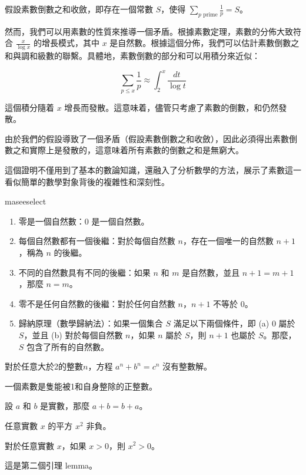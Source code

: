 \documentclass[
    writingLanguage=chinese, %
    addPageTitle=on,  %
    addDeclaration=on, %
    addMUSTlog=off, %
    addFigTOC=on, %
    addTabTOC=on, %
    refIndent=off, %
    printMod=off, %
]{must}
\begin{document}
假設素數倒數之和收斂，即存在一個常數 \( S \)，使得 \( \sum_{p \text{ prime}} \frac{1}{p} = S \)。

然而，我們可以用素數的性質來推導一個矛盾。根據素數定理，素數的分佈大致符合 \( \frac{x}{\log x} \) 的增長模式，其中 \( x \) 是自然數。根據這個分佈，我們可以估計素數倒數之和與調和級數的聯繫。具體地，素數倒數的部分和可以用積分來近似：

\[
\sum_{p \leq x} \frac{1}{p} \approx \int_2^x \frac{dt}{\log t}
\]

這個積分隨着 \( x \) 增長而發散。這意味着，儘管只考慮了素數的倒數，和仍然發散。

由於我們的假設導致了一個矛盾（假設素數倒數之和收斂），因此必須得出素數倒數之和實際上是發散的，這意味着所有素數的倒數之和是無窮大。

這個證明不僅用到了基本的數論知識，還融入了分析數學的方法，展示了素數這一看似簡單的數學對象背後的複雜性和深刻性。
\begin{axiom}[皮亞諾公理 1]
maseeselect
\begin{enumerate}[label=\Alph*.]
\item 零是一個自然數：$0$ 是一個自然數。
\item 每個自然數都有一個後繼：對於每個自然數 $n$，存在一個唯一的自然數 $n+1$，稱為 $n$ 的後繼。
\item 不同的自然數具有不同的後繼：如果 $n$ 和 $m$ 是自然數，並且 $n+1 = m+1$，那麼 $n = m$。
\item 零不是任何自然數的後繼：對於任何自然數 $n$，$n+1$ 不等於 $0$。
\item 歸納原理（數學歸納法）：如果一個集合 $S$ 滿足以下兩個條件，即 (a) $0$ 屬於 $S$，並且 (b) 對於每個自然數 $n$，如果 $n$ 屬於 $S$，則 $n+1$ 也屬於 $S$。那麼，$S$ 包含了所有的自然數。
\end{enumerate}
\end{axiom}

\begin{theorem}[費馬定理]
對於任意大於2的整數$n$，方程 $a^n + b^n = c^n$ 沒有整數解。
\end{theorem}

\begin{definition}
    一個素數是隻能被1和自身整除的正整數。
\end{definition}
\begin{example}
    設 $a$ 和 $b$ 是實數，那麼 $a+b=b+a$。
\end{example}

\begin{property}
    任意實數 $x$ 的平方 $x^2$ 非負。
\end{property}
\begin{proposition}
    對於任意實數 $x$，如果 $x > 0$，則 $x^2 > 0$。
\end{proposition}
\begin{lemma}
這是第二個引理 lemma。
\end{lemma}
\end{document}
